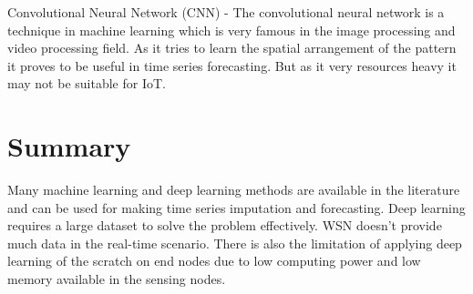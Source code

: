 Convolutional Neural Network (CNN) - 
The convolutional neural network is a technique in machine learning which is very famous in the image processing and video processing field. As it tries to learn the spatial arrangement of the pattern it proves to be useful in time series forecasting. But as it very resources heavy it may  not be suitable for IoT.\cite{29}
\\

\section{Summary}
Many machine learning and deep learning methods are available in the literature and can be used for making time series imputation and forecasting. Deep learning requires a large dataset to solve the problem effectively. WSN doesn't provide much data in the real-time scenario. There is also the limitation of applying deep learning of the scratch on end nodes due to low computing power and low memory available in the sensing nodes.